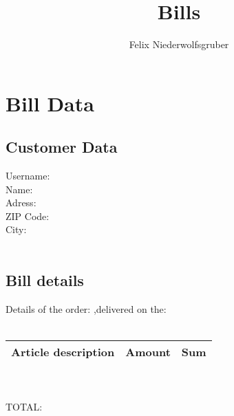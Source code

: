 \documentclass[10pt] {article}
\author{Felix Niederwolfsgruber}
\title{Bills}
\begin{document}
\section {Bill Data}
\subsection {Customer Data}
Username: %
\\
Name: %
\\
Adress: %
\\
ZIP Code: %
\\
City: %
\\
\\
\subsection {Bill details}
Details of the order: %
,delivered on the:  
\\
\\
\begin {tabular} {|c|c|c|}
\hline Article description&Amount&Sum\\ \hline
\end {tabular}
\\
\\
TOTAL: %
\end{document}
